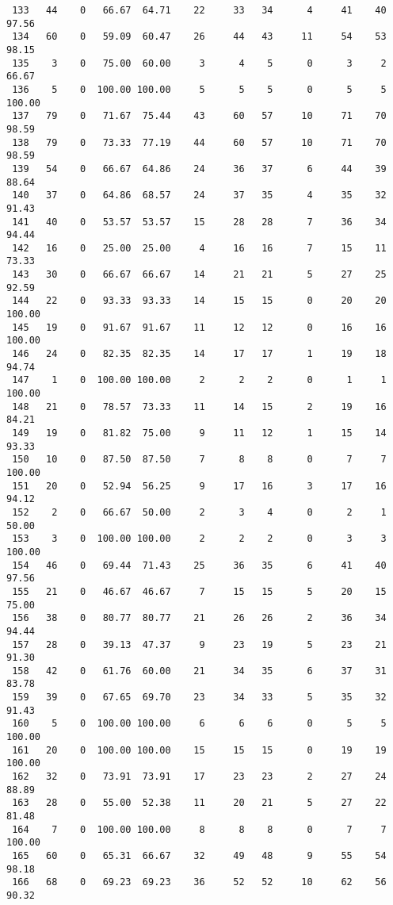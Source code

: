 \begin{verbatim}
 133   44    0   66.67  64.71    22     33   34      4     41    40    97.56
 134   60    0   59.09  60.47    26     44   43     11     54    53    98.15
 135    3    0   75.00  60.00     3      4    5      0      3     2    66.67
 136    5    0  100.00 100.00     5      5    5      0      5     5   100.00
 137   79    0   71.67  75.44    43     60   57     10     71    70    98.59
 138   79    0   73.33  77.19    44     60   57     10     71    70    98.59
 139   54    0   66.67  64.86    24     36   37      6     44    39    88.64
 140   37    0   64.86  68.57    24     37   35      4     35    32    91.43
 141   40    0   53.57  53.57    15     28   28      7     36    34    94.44
 142   16    0   25.00  25.00     4     16   16      7     15    11    73.33
 143   30    0   66.67  66.67    14     21   21      5     27    25    92.59
 144   22    0   93.33  93.33    14     15   15      0     20    20   100.00
 145   19    0   91.67  91.67    11     12   12      0     16    16   100.00
 146   24    0   82.35  82.35    14     17   17      1     19    18    94.74
 147    1    0  100.00 100.00     2      2    2      0      1     1   100.00
 148   21    0   78.57  73.33    11     14   15      2     19    16    84.21
 149   19    0   81.82  75.00     9     11   12      1     15    14    93.33
 150   10    0   87.50  87.50     7      8    8      0      7     7   100.00
 151   20    0   52.94  56.25     9     17   16      3     17    16    94.12
 152    2    0   66.67  50.00     2      3    4      0      2     1    50.00
 153    3    0  100.00 100.00     2      2    2      0      3     3   100.00
 154   46    0   69.44  71.43    25     36   35      6     41    40    97.56
 155   21    0   46.67  46.67     7     15   15      5     20    15    75.00
 156   38    0   80.77  80.77    21     26   26      2     36    34    94.44
 157   28    0   39.13  47.37     9     23   19      5     23    21    91.30
 158   42    0   61.76  60.00    21     34   35      6     37    31    83.78
 159   39    0   67.65  69.70    23     34   33      5     35    32    91.43
 160    5    0  100.00 100.00     6      6    6      0      5     5   100.00
 161   20    0  100.00 100.00    15     15   15      0     19    19   100.00
 162   32    0   73.91  73.91    17     23   23      2     27    24    88.89
 163   28    0   55.00  52.38    11     20   21      5     27    22    81.48
 164    7    0  100.00 100.00     8      8    8      0      7     7   100.00
 165   60    0   65.31  66.67    32     49   48      9     55    54    98.18
 166   68    0   69.23  69.23    36     52   52     10     62    56    90.32

\end{verbatim}
